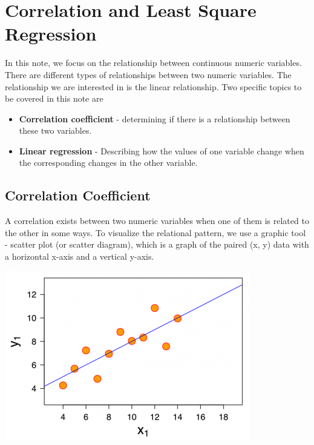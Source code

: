 \documentclass[
]{book}
\begin{document}
\hypertarget{correlation-and-least-square-regression}{%
\chapter{Correlation and Least Square Regression}\label{correlation-and-least-square-regression}}

\hfill\break
In this note, we focus on the relationship between continuous numeric variables. There are different types of relationships between two numeric variables. The relationship we are interested in is the linear relationship. Two specific topics to be covered in this note are

\begin{itemize}
\item
  \textbf{Correlation coefficient} - determining if there is a relationship between these two variables.
\item
  \textbf{Linear regression} - Describing how the values of one variable change when the corresponding changes in the other variable.
\end{itemize}

\hfill\break

\hypertarget{correlation-coefficient}{%
\section{Correlation Coefficient}\label{correlation-coefficient}}

\hfill\break

A correlation exists between two numeric variables when one of them is related to the other in some ways. To visualize the relational pattern, we use a graphic tool - scatter plot (or scatter diagram), which is a graph of the paired (x, y) data with a horizontal x-axis and a vertical y-axis.

\hfill\break

\begin{center}\includegraphics[width=0.5\linewidth]{week12/scatterPlot} \end{center}
\end{document}
